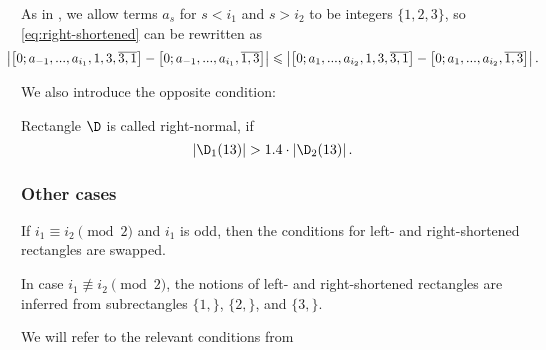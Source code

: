 As in ,
we allow terms $a_s$ for $s < i_1$ and $s > i_2$ to be integers $\{1, 2, 3\}$,
so \ref{eq:right-shortened} can be rewritten as
%
\begin{equation*}
	\hspace*{-12pt}
	\left|
		\left[ 0; a_{-1}, ..., a_{i_1}, 1, 3, \overline{3, 1} \right] -
		\left[ 0; a_{-1}, ..., a_{i_1}, \overline{1, 3} \right]
	\right| \leqslant \left|
		\left[ 0; a_{1}, ..., a_{i_2}, 1, 3, \overline{3, 1} \right] -
		\left[ 0; a_{1}, ..., a_{i_2}, \overline{1, 3} \right]
	\right|.
	\hspace*{-12pt}
\end{equation*}

We also introduce the opposite condition:

\begin{definition}
	Rectangle $\D$ is called right-normal, if
	\begin{equation}
		\label{eq:right-normal}
		\left| \D_1(13) \right| > 1.4 \cdot \left| \D_2(13) \right|.
	\end{equation}
\end{definition}


\subsubsection{Other cases}

If $i_1 \equiv i_2 \pmod 2$ and $i_1$ is odd,
then the conditions for left- and right-shortened rectangles are swapped.

In case $i_1 \not\equiv i_2 \pmod 2$,
the notions of left- and right-shortened rectangles
are inferred from subrectangles $\{1,\}$, $\{2,\}$, and $\{3,\}$.

We will refer to the relevant conditions from 
